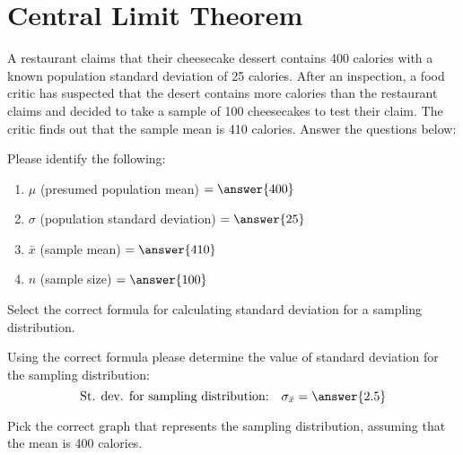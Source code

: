 \documentclass{ximera}
\begin{document}
\section{Central Limit Theorem}
\begin{problem}\label{pr:cheesecake}
A restaurant claims that their cheesecake dessert contains 400 calories with a known population standard deviation of 25 calories. After an inspection, a food critic has suspected that the desert contains more calories than the restaurant claims and decided to take a sample of 100 cheesecakes to test their claim. The critic finds out that the sample mean is 410 calories. Answer the questions below:

\begin{question} 
Please identify the following:
\begin{enumerate}
    \item $\mu$ (presumed population mean) $= \answer{400}$
    \item $\sigma$ (population standard deviation) $= \answer{25}$
    \item $\bar{x}$ (sample mean) $=\answer{410}$
    \item $n$ (sample size) $= \answer{100}$
\end{enumerate}
\end{question}

\begin{question} Select the correct formula for calculating standard deviation for a sampling distribution.

\begin{multipleChoice}  
\end{multipleChoice} 

\end{question}

\begin{question} Using the correct formula please determine the value of standard deviation for the sampling distribution:
$$\mbox{St. dev. for sampling distribution:}\quad\sigma_{\bar{x}}= \answer{2.5}$$
\end{question}

\begin{question} Pick the correct graph that represents the sampling distribution, assuming that the mean is 400 calories. %


\end{question}
\end{problem}
\end{document}

